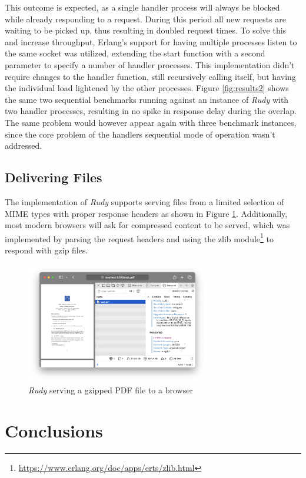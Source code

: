 \documentclass[a4paper, 11pt]{article}
\begin{document}
This outcome is expected, as a single handler process will always be blocked while already responding to a request. During this period all new requests are waiting to be picked up, thus resulting in doubled request times.
To solve this and increase throughput, Erlang's support for having multiple processes listen to the same socket was utilized, extending the start function with a second parameter to specify a number of handler processes. This implementation didn't require changes to the handler function, still recursively calling itself, but having the individual load lightened by the other processes.
Figure \ref{fig:results2} shows the same two sequential benchmarks running against an instance of \textit{Rudy} with two handler processes, resulting in no spike in response delay during the overlap. The same problem would however appear again with three benchmark instances, since the core problem of the handlers sequential mode of operation wasn't addressed.

\subsection{Delivering Files}
The implementation of \textit{Rudy} supports serving files from a limited selection of MIME types with proper response headers as shown in Figure \ref{fig:browser1}. Additionally, most modern browsers will ask for compressed content to be served, which was implemented by parsing the request headers and using the zlib module\footnote{\url{https://www.erlang.org/doc/apps/erts/zlib.html}} to respond with gzip files. 
\begin{figure}[H]
  \begin{center}
    \includegraphics[height=200px]{graphs/browser/pdf-gzip.png}
    \caption{\textit{Rudy} serving a gzipped PDF file to a browser}
    \label{fig:browser1}
  \end{center}
\end{figure}

\section{Conclusions}
\end{document}
